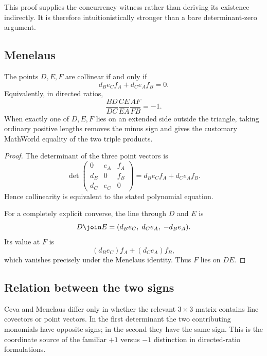 This proof supplies the concurrency witness rather than deriving its existence indirectly.  It is therefore intuitionistically stronger than a bare determinant-zero argument.

\subsection{Menelaus}

\begin{theorem}
The points $D,E,F$ are collinear if and only if
\[
d_Be_Cf_A+d_Ce_Af_B=0.
\]
Equivalently, in directed ratios,
\[
\frac{BD}{DC}\frac{CE}{EA}\frac{AF}{FB}=-1.
\]
When exactly one of $D,E,F$ lies on an extended side outside the triangle, taking ordinary positive lengths removes the minus sign and gives the customary MathWorld equality of the two triple products.
\end{theorem}

\begin{proof}
The determinant of the three point vectors is
\[
\det\begin{pmatrix}
0&e_A&f_A\\
d_B&0&f_B\\
d_C&e_C&0
\end{pmatrix}
=d_Be_Cf_A+d_Ce_Af_B.
\]
Hence collinearity is equivalent to the stated polynomial equation.

For a completely explicit converse, the line through $D$ and $E$ is
\[
D\join E=(d_Be_C,\;d_Ce_A,\;-d_Be_A).
\]
Its value at $F$ is
\[
(d_Be_C)f_A+(d_Ce_A)f_B,
\]
which vanishes precisely under the Menelaus identity.  Thus $F$ lies on $DE$.
\end{proof}

\subsection{Relation between the two signs}

Ceva and Menelaus differ only in whether the relevant $3\times3$ matrix contains line covectors or point vectors.  In the first determinant the two contributing monomials have opposite signs; in the second they have the same sign.  This is the coordinate source of the familiar $+1$ versus $-1$ distinction in directed-ratio formulations.
